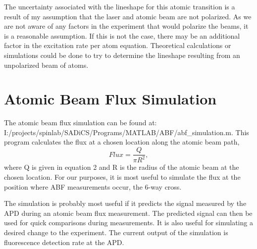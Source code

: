 \documentclass[12pt, a4paper]{article}
\begin{document}
The uncertainty associated with the lineshape for this atomic transition is a result of my assumption that the laser and atomic beam are not polarized. As we are not aware of any factors in the experiment that would polarize the beams, it is a reasonable assumption. If this is not the case, there may be an additional factor in the excitation rate per atom equation. Theoretical calculations or simulations could be done to try to determine the lineshape resulting from an unpolarized beam of atoms. 

\section{Atomic Beam Flux Simulation}
The atomic beam flux simulation can be found at: \\\footnotesize I:/projects/spinlab/SADiCS/Programs/MATLAB/ABF/abf\_simulation.m. \normalsize This program calculates the flux at a chosen location along the atomic beam path,
\begin{equation}
Flux = \frac{Q}{\pi R^{2}},
\end{equation}
where Q is given in equation 2 and R is the radius of the atomic beam at the chosen location. For our purposes, it is most useful to simulate the flux at the position where ABF measurements occur, the 6-way cross. 

The simulation is probably most useful if it predicts the signal measured by the APD during an atomic beam flux measurement. The predicted signal can then be used for quick comparisons during measurements. It is also useful for simulating a desired change to the experiment. The current output of the simulation is fluorescence detection rate at the APD.


\nocite{*}
{}

\end{document}
